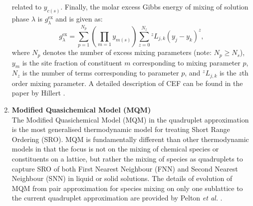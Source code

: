 \begin{enumerate}
related to $y_{c(s)}$.  Finally, the molar excess Gibbs energy of mixing of solution phase $\lambda$ is
$g_{\lambda}^\text{ex}$ and is given as:
\begin{equation}
	\label{eq:g_ex}
	g_{\lambda}^\text{ex} = 	 \sum_{p=1}^{N_p} \left( \prod_{m=1} y_{m(s)}  \right)   \sum_{z=0}^{N_z} {^zL_{j,k}} (y_j - y_k)^{z},
\end{equation}
where $N_p$ denotes the number of excess mixing parameters (note: $N_p \ge N_s$), $y_m$ is the site fraction of constituent $m$ corresponding to mixing parameter $p$, $N_z$ is the number of terms corresponding to parameter $p$,  and ${^zL_{j,k}}$ is the $z$th order mixing parameter. A detailed description of CEF can be found in the paper by Hillert \cite{Hillert01}.
	\item \textbf{Modified Quasichemical Model (MQM)} \\
	The Modified Quasichemical Model (MQM) in the quadruplet approximation is the most generalised thermodynamic model for treating Short Range Ordering (SRO). MQM is fundamentally different than other thermodynamic models in that the focus is not on the mixing of chemical species or constituents on a lattice, but rather the mixing of species as quadruplets to capture SRO of both First Nearest Neighbour (FNN) and Second Nearest Neighbour (SNN) in liquid or solid solutions. The details of evolution of MQM from pair approximation for species mixing on only one sublattice to the current quadruplet approximation are provided by Pelton \textit{et al.} \cite{Pelton00,Pelton01,Chartrand01,Pelton01b}.


\end{enumerate}
